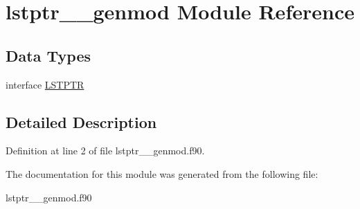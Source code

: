 \hypertarget{classlstptr____genmod}{\section{lstptr\+\_\+\+\_\+genmod Module Reference}
\label{classlstptr____genmod}
}
\subsection*{Data Types}
\begin{DoxyCompactItemize}
\item 
interface \hyperlink{interfacelstptr____genmod_1_1_l_s_t_p_t_r}{L\+S\+T\+P\+T\+R}
\end{DoxyCompactItemize}


\subsection{Detailed Description}


Definition at line 2 of file lstptr\+\_\+\+\_\+genmod.\+f90.



The documentation for this module was generated from the following file\+:\begin{DoxyCompactItemize}
\item 
lstptr\+\_\+\+\_\+genmod.\+f90\end{DoxyCompactItemize}
